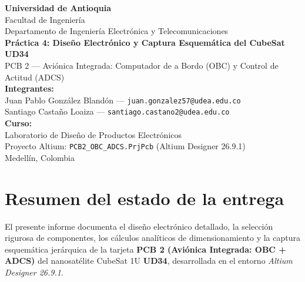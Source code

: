 \documentclass[11pt,a4paper]{article}
\begin{document}
\begin{titlepage}
    \centering
    \vspace*{1.5cm}
    {\Huge \textbf{\color{udacolor} Universidad de Antioquia}}\\[0.4cm]
    {\LARGE Facultad de Ingeniería}\\[0.4cm]
    {\Large Departamento de Ingeniería Electrónica y Telecomunicaciones}\\[1.8cm]
    {\huge \textbf{Práctica 4: Diseño Electrónico y Captura Esquemática del CubeSat UD34}}\\[0.5cm]
    {\Large PCB 2 --- Aviónica Integrada: Computador de a Bordo (OBC) y Control de Actitud (ADCS)}\\[1.8cm]
    {\Large \textbf{Integrantes:}}\\[0.4cm]
    {\large Juan Pablo González Blandón --- \texttt{juan.gonzalez57@udea.edu.co}}\\[0.2cm]
    {\large Santiago Castaño Loaiza --- \texttt{santiago.castano2@udea.edu.co}}\\[1.8cm]
    {\Large \textbf{Curso:}}\\[0.3cm]
    {\large Laboratorio de Diseño de Productos Electrónicos}\\[0.8cm]
    {\large Proyecto Altium: \texttt{PCB2\_OBC\_ADCS.PrjPcb} (Altium Designer 26.9.1)}\\
    \vfill
    {\large Medellín, Colombia}
\end{titlepage}

\tableofcontents
\newpage

\section{Resumen del estado de la entrega}

El presente informe documenta el diseño electrónico detallado, la selección rigurosa de componentes, los cálculos analíticos de dimensionamiento y la captura esquemática jerárquica de la tarjeta \textbf{PCB 2 (Aviónica Integrada: OBC + ADCS)} del nanosatélite CubeSat 1U \textbf{UD34}, desarrollada en el entorno \emph{Altium Designer 26.9.1}. 
\end{document}
